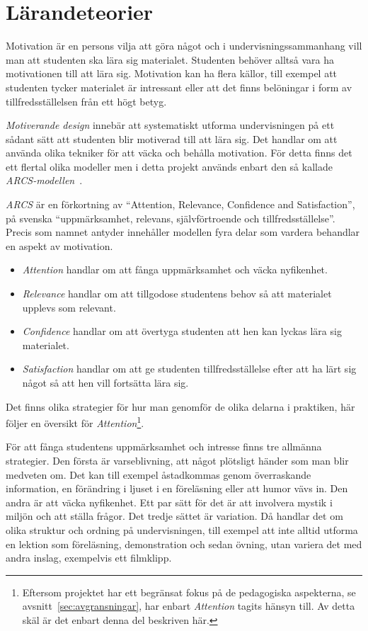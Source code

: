 \section{Lärandeteorier}\label{sec:arcs}

Motivation är en persons vilja att göra något och i undervisningssammanhang vill
man att studenten ska lära sig materialet. Studenten behöver alltså vara
ha motivationen till att lära sig. Motivation kan ha flera källor, till exempel
att studenten tycker materialet är intressant eller att det finns belöningar i
form av tillfredsställelsen från ett högt betyg. 

\textit{Motiverande design} innebär att systematiskt utforma undervisningen på
ett sådant sätt att studenten blir motiverad till att lära sig. Det handlar om
att använda olika tekniker för att väcka och behålla motivation. För detta finns
det ett flertal olika modeller men i detta projekt används enbart den så
kallade \textit{ARCS-modellen}~\cite{arcs_book}.

\textit{ARCS} är en förkortning av ``Attention, Relevance, Confidence and
Satisfaction'', på svenska ``uppmärksamhet, relevans, självförtroende och
tillfredsställelse''. Precis som namnet antyder innehåller modellen fyra delar
som vardera behandlar en aspekt av motivation. 
\begin{itemize}
  \item \textit{Attention} handlar om att fånga uppmärksamhet och väcka
    nyfikenhet. 
  \item \textit{Relevance} handlar om att tillgodose studentens behov så
    att materialet upplevs som relevant.  
  \item \textit{Confidence} handlar om att övertyga studenten att hen kan lyckas
    lära sig materialet. 
  \item \textit{Satisfaction} handlar om att ge studenten
    tillfredsställelse efter att ha lärt sig något så att hen vill fortsätta
    lära sig. 
\end{itemize}
Det finns olika strategier för hur man genomför de olika delarna i praktiken, 
här följer en översikt för \textit{Attention}\footnote{Eftersom projektet har
ett begränsat fokus på de pedagogiska aspekterna, se
avsnitt~\ref{sec:avgransningar}, har enbart \textit{Attention} tagits hänsyn
till. Av detta skäl är det enbart denna del beskriven här.}.

För att fånga studentens uppmärksamhet och intresse finns tre allmänna
strategier. Den första är varseblivning, att något plötsligt händer som man
blir medveten om. Det kan till exempel åstadkommas genom överraskande
information, en förändring i ljuset i en föreläsning eller att humor vävs in.
Den andra är att väcka nyfikenhet. Ett par sätt för det är att involvera mystik
i miljön och att ställa frågor. Det tredje sättet är variation. Då handlar det
om olika struktur och ordning på undervisningen, till exempel att inte alltid
utforma en lektion som föreläsning, demonstration och sedan övning, utan variera
det med andra inslag, exempelvis ett filmklipp.

